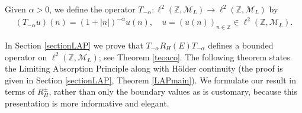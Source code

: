 \documentclass[12pt,oneside,onecolumn,open]{article}
\begin{document}














Given $\alpha > 0$, we define the operator $T_{-\alpha} : \ell^{2}(\mathbb{Z}, \mathcal{M}_L) \longrightarrow \ell^{2}(\mathbb{Z}, \mathcal{M}_L)$ by
\begin{align}\label{Tsigma}
(T_{-\alpha} u)(n) = (1+|n|)^{-\alpha} u(n), \quad u = (u(n))_{n \in \mathbb{Z}} \in \ell^{2}(\mathbb{Z}, \mathcal{M}_L).
\end{align}

In Section \ref{sectionLAP} we prove that $ T_{-\alpha} R_{H}(E) T_{-\alpha} $ defines a bounded operator on $\ell^{2}(\mathbb{Z}, \mathcal{M}_L)$; see Theorem \ref{teoaco}. The following theorem states the Limiting Absorption Principle along with H\"older continuity (the proof is given in Section \ref{sectionLAP}, Theorem \ref{LAPmain}). We formulate our result in terms of $ R_H^{\pm} $, rather than only the boundary values as is customary, because this presentation is more informative and elegant.
\end{document}
